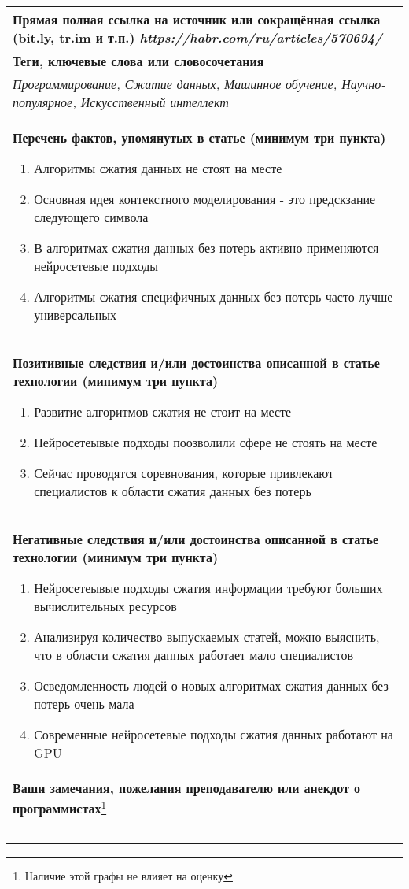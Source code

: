 \documentclass[12pt]{article}
\begin{document}
\begin{tabularx}{\textwidth} { 
  | >{\raggedright\arraybackslash}X|}
    \textbf{Прямая полная ссылка на источник или сокращённая ссылка (bit.ly, tr.im и т.п.)} 
    \textit{https://habr.com/ru/articles/570694/}
    \smallskip\\
    \hline
    \textbf{Теги, ключевые слова или словосочетания}\\
    \textit{Программирование, Сжатие данных, Машинное обучение, Научно-популярное, Искусственный интеллект}
    \smallskip\\
    \hline
    \textbf{Перечень фактов, упомянутых в статье (минимум три пункта)}
    \begin{enumerate}
    	\item Алгоритмы сжатия данных не стоят на месте
	\item Основная идея контекстного моделирования - это предскзание следующего символа
    	\item В алгоритмах сжатия данных без потерь активно применяются нейросетевые подходы
    	\item Алгоритмы сжатия специфичных данных без потерь часто лучше универсальных 
    	
	\end{enumerate}
    \\ \hline
    \textbf{Позитивные следствия и/или достоинства описанной в статье технологии (минимум три пункта)}
    \begin{enumerate}
	\item Развитие алгоритмов сжатия не стоит на месте
    	\item Нейросетеывые подходы поозволили сфере не стоять на месте
    	\item Сейчас проводятся соревнования, которые привлекают специалистов к области сжатия данных без потерь
    \end{enumerate}
    \\ \hline
    \textbf{Негативные следствия и/или достоинства описанной в статье технологии (минимум три пункта)}
    \begin{enumerate}
    	\item Нейросетеывые подходы сжатия информации требуют больших вычислительных ресурсов
    	\item Анализируя количество выпускаемых статей, можно выяснить, что в области сжатия данных работает мало специалистов
    	\item Осведомленность людей о новых алгоритмах сжатия данных без потерь очень мала
	\item Современные нейросетевые подходы сжатия данных работают на GPU
    \end{enumerate}
    \\ \hline
    \textbf{Ваши замечания, пожелания преподавателю или анекдот о программистах}\footnote{Наличие этой графы не влияет на оценку}\\
    \bigskip\
    \bigskip\\
    \hline
    
\end{tabularx}
\end{document}
